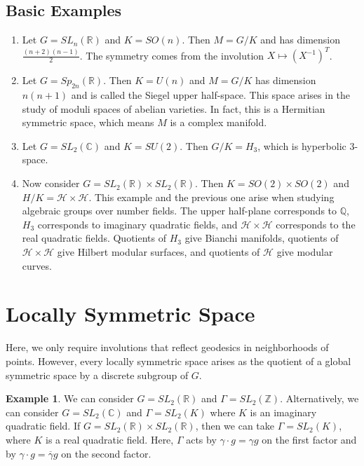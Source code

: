 \documentclass[leqno, openany]{memoir}
\theoremstyle{definition}
\newtheorem{exm}[thm]{Example}
\theoremstyle{remark}
\theoremstyle{plain}
\theoremstyle{definition}
\theoremstyle{remark}
\newcommand{\R}{\mathbb{R}}
\newcommand{\C}{\mathbb{C}}
\newcommand{\Z}{\mathbb{Z}}
\newcommand{\Q}{\mathbb{Q}}
\newcommand{\mc}[1]{\mathcal{#1}}
\begin{document}
\subsection{Basic Examples}%

\begin{enumerate} \item Let $G = SL_n(\R)$ and $K = SO(n)$. Then $M = G/K$ and
    has dimension $\frac{(n+2)(n-1)}{2}$. The symmetry comes from the
    involution $X \mapsto (X^{-1})^T$.  \item Let $G = Sp_{2n}(\R)$. Then $K =
    U(n)$ and $M = G/K$ has dimension $n(n+1)$ and is called the Siegel upper
    half-space. This space arises in the study of moduli spaces of abelian
    varieties. In fact, this is a Hermitian symmetric space, which means $M$ is
    a complex manifold.  \item Let $G = SL_2(\C)$ and $K = SU(2)$. Then $G/K =
    H_3$, which is hyperbolic $3$-space.  \item Now consider $G = SL_2(\R)
    \times SL_2(\R)$. Then $K = SO(2) \times SO(2)$ and $H/K = \mc{H} \times
    \mc{H}$. This example and the previous one arise when studying algebraic
    groups over number fields. The upper half-plane corresponds to $\Q$, $H_3$
    corresponds to imaginary quadratic fields, and $\mc{H} \times \mc{H}$
    corresponds to the real quadratic fields. Quotients of $H_3$ give Bianchi
    manifolds, quotients of $\mc{H} \times \mc{H}$ give Hilbert modular
    surfaces, and quotients of $\mc{H}$ give modular curves.  \end{enumerate}

\section{Locally Symmetric Space}%

Here, we only require involutions that reflect geodesics in neighborhoods of
points. However, every locally symmetric space arises as the quotient of a
global symmetric space by a discrete subgroup of $G$.

\begin{exm} We can consider $G = SL_2(\R)$ and $\Gamma = SL_2(\Z)$.
    Alternatively, we can consider $G = SL_2(\C)$ and $\Gamma = SL_2(K)$ where
    $K$ is an imaginary quadratic field. If $G = SL_2(\R) \times SL_2(\R)$,
    then we can take $\Gamma = SL_2(K)$, where $K$ is a real quadratic field.
    Here, $\Gamma$ acts by $\gamma \cdot g = \gamma g$ on the first factor and
    by $\gamma \cdot g = \overline{\gamma} g$ on the second factor.  \end{exm}
\end{document}
